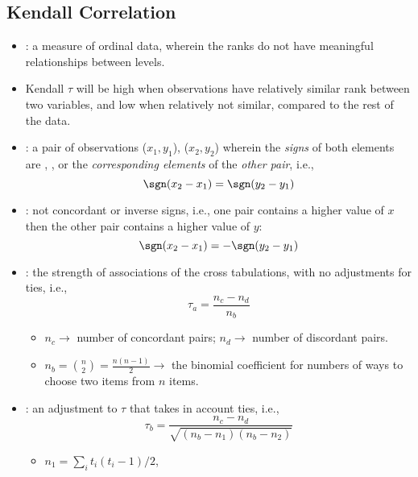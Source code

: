 \begin{itemize}
  \subsection{Kendall Correlation}
  \begin{itemize}
    \item {}: a measure of ordinal data, wherein the ranks do not have meaningful relationships between levels.
    \item Kendall \(\tau \) will be high when observations have relatively similar rank between two variables, and low when relatively not similar, compared to the rest of the data.
    \item {}: a pair of observations (\(x_1,y_1\)), (\(x_2,y_2\)) wherein the \emph{signs} of both elements are , , or  the \emph{corresponding elements} of the \emph{other pair}, i.e.,
    \[%
    \sgn(x_2-x_1) = \sgn(y_2-y_1)
    \]%
    \item {}: not concordant or inverse signs, i.e., one pair contains a higher value of \(x\) then the other pair contains a higher value of \(y\): 
    \[%
    \sgn(x_2-x_1) = -\sgn(y_2-y_1)
    \]%
    \item {}: the strength of associations of the cross tabulations, with no adjustments for ties, i.e.,
    \[%
    \tau_a = \frac{n_c - n_d}{n_b}
    \]%
    \begin{itemize}
      \item \(n_c\to\) number of concordant pairs; \(n_d\to\) number of discordant pairs.
      \item \(n_b = \binom{n}{2} = \frac{n(n-1)}{2}\to\) the binomial coefficient for numbers of ways to choose two items from \(n\) items.
    \end{itemize}
    \item {}: an adjustment to \(\tau \) that takes in account ties, i.e.,
    \[%
    \tau_b = \frac{n_c - n_d}{\sqrt{(n_b-n_1)(n_b-n_2)}}
    \]%
    \begin{itemize}
      \item \(n_1 = \sum_{i} t_i(t_i -1)/2\), 

\end{itemize}
\end{itemize}
\end{itemize}
